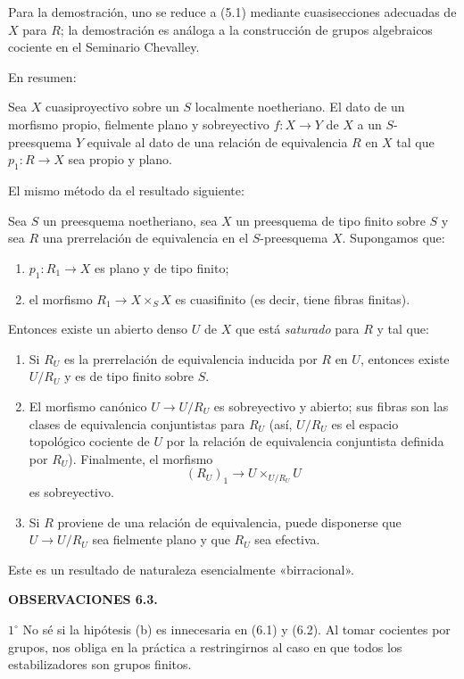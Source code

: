 Para la demostración, uno se reduce a (5.1) mediante cuasisecciones adecuadas
de $X$ para $R$; la demostración es análoga a la construcción de grupos
algebraicos cociente en el Seminario Chevalley.

En resumen:

 Sea $X$ cuasiproyectivo sobre un $S$ localmente
noetheriano. El dato de un morfismo propio, fielmente plano y sobreyectivo
$f:X\to Y$ de $X$ a un $S$-preesquema $Y$ equivale al dato de una relación de
equivalencia $R$ en $X$ tal que $p_1:R\to X$ sea propio y plano.

El mismo método da el resultado siguiente:

 Sea $S$ un preesquema noetheriano, sea $X$ un
preesquema de tipo finito sobre $S$ y sea $R$ una prerrelación de equivalencia
en el $S$-preesquema $X$. Supongamos que:
\begin{enumerate}
\item[(a)] $p_1:R_1\to X$ es plano y de tipo finito;
\item[(b)] el morfismo $R_1\to X\times_S X$ es cuasifinito (es decir, tiene
fibras finitas).
\end{enumerate}
Entonces existe un abierto denso $U$ de $X$ que está \emph{saturado} para $R$
y tal que:
\begin{enumerate}
\item[(i)] Si $R_U$ es la prerrelación de equivalencia inducida por $R$ en
$U$, entonces existe $U/R_U$ y es de tipo finito sobre $S$.

\item[(ii)] El morfismo canónico $U\to U/R_U$ es sobreyectivo y abierto; sus
fibras son las clases de equivalencia conjuntistas para $R_U$ (así,
$U/R_U$ es el espacio topológico cociente de $U$ por la relación de
equivalencia conjuntista definida por $R_U$). Finalmente, el morfismo
\[
  (R_U)_1\longrightarrow U\times_{U/R_U}U
\]
es sobreyectivo.

\item[(iii)] Si $R$ proviene de una relación de equivalencia, puede disponerse
que $U\to U/R_U$ sea fielmente plano y que $R_U$ sea efectiva.
\end{enumerate}

Este es un resultado de naturaleza esencialmente «birracional».

\medskip
\noindent\textbf{OBSERVACIONES 6.3.}

\smallskip
\noindent $1^\circ$ No sé si la hipótesis (b) es innecesaria en (6.1) y
(6.2). Al tomar cocientes por grupos, nos obliga en la práctica a
restringirnos al caso en que todos los estabilizadores son grupos finitos.

